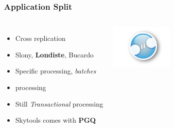 \documentclass[english]{beamer}
\begin{document}
\begin{frame}[fragile]
  \frametitle{Application Split}

  \vfill

\begin{columns}[c]

  \begin{itemize}
   \item<1-> Cross replication
   \item<2-> Slony, \textbf{Londiste}, Bucardo
   \item<3-> Specific processing, \textit{batches}
   \item<3->  processing
   \item<3-> Still \textit{Transactional} processing
   \item<4-> Skytools comes with \alert{\textbf{PGQ}}
  \end{itemize}  

\includegraphics[height=6em]{cross-replication.jpg}
\end{columns}
\end{frame}

\end{document}

